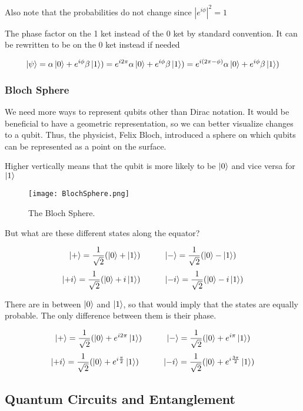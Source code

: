 \documentclass[12pt]{article}
\begin{document}
Also note that the probabilities do not change since $|e^{i\phi}|^2 = 1$

The phase factor on the 1 ket instead of the 0 ket by standard convention. It can be rewritten to be on the 0 ket instead if needed

$$
\ket{\psi} = \alpha \ket{0} + e^{i\phi} \beta \ket{1}) = e^{i2\pi} \alpha \ket{0} + e^{i\phi} \beta \ket{1}) = e^{i(2\pi - \phi)} \alpha \ket{0} + e^{i\phi} \beta \ket{1})
$$


\subsubsection{Bloch Sphere}

We need more ways to represent qubits other than Dirac notation. It would be beneficial to have a geometric representation, so we can better visualize changes to a qubit. Thus, the physicist, Felix Bloch, introduced a sphere on which qubits can be represented as a point on the surface.

Higher vertically means that the qubit is more likely to be $\ket{0}$ and vice versa for $\ket{1}$

\begin{figure}[h]
    \centering
    \texttt{[image: BlochSphere.png]}
    \caption{The Bloch Sphere.}
    \cite{Bloch_Sphere}
    \label{fig:Bloch_Sphere}
\end{figure}


But what are these different states along the equator? 

$$
\ket{+} = \frac{1}{\sqrt{2}}( \ket{0}  + \ket{1})
\hspace{1cm}
\ket{-} = \frac{1}{\sqrt{2}}( \ket{0}  - \ket{1})
$$
$$
\ket{+i} = \frac{1}{\sqrt{2}}( \ket{0}  + i\ket{1})
\hspace{1cm}
\ket{-i} = \frac{1}{\sqrt{2}}( \ket{0}  - i\ket{1})
$$

There are in between $\ket{0}$ and $\ket{1}$, so that would imply that the states are equally probable. The only difference between them is their phase. 

$$
\ket{+} = \frac{1}{\sqrt{2}}( \ket{0}  + e^{i 2\pi}\ket{1})
\hspace{1cm}
\ket{-} = \frac{1}{\sqrt{2}}( \ket{0}  + e^{i \pi}\ket{1})
$$
$$
\ket{+i} = \frac{1}{\sqrt{2}}( \ket{0}  + e^{i \frac{\pi}{2}}\ket{1})
\hspace{1cm}
\ket{-i} = \frac{1}{\sqrt{2}}( \ket{0}  + e^{i \frac{3\pi}{2}} \ket{1})
$$

\subsection{Quantum Circuits and Entanglement}
\end{document}
